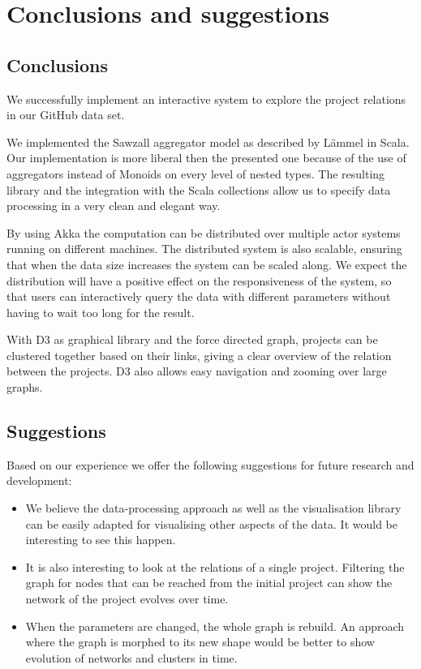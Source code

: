 \documentclass[10pt,a4paper]{article}
\begin{document}
\section{Conclusions and suggestions}\label{sec:conclusions}

\subsection{Conclusions}

We successfully implement an interactive system to explore the project relations in our GitHub data set.

We implemented the Sawzall aggregator model as described by L\"ammel in Scala. Our implementation is more liberal then the presented one because of the use of aggregators instead of Monoids on every level of nested types. The resulting library and the integration with the Scala collections allow us to specify data processing in a very clean and elegant way.

By using Akka the computation can be distributed over multiple actor systems running on different machines. The distributed system is also scalable, ensuring that when the data size increases the system can be scaled along. We expect the distribution will have a positive effect on the responsiveness of the system, so that users can interactively query the data with different parameters without having to wait too long for the result.

With D3 as graphical library and the force directed graph, projects can be clustered together based on their links, giving a clear overview of the relation between the projects. D3 also allows easy navigation and zooming over large graphs.

\subsection{Suggestions}

Based on our experience we offer the following suggestions for future research and development:

\begin{itemize}
    \item We believe the data-processing approach as well as the visualisation library can be easily adapted for visualising other aspects of the data. It would be interesting to see this happen.
    \item It is also interesting to look at the relations of a single project. Filtering the graph for nodes that can be reached from the initial project can show the network of the project evolves over time.
    \item When the parameters are changed, the whole graph is rebuild. An approach where the graph is morphed to its new shape would be better to show evolution of networks and clusters in time.
\end{itemize}



\end{document}

